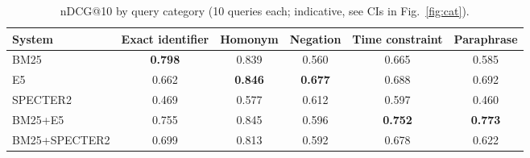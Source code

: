 \begin{table}[t]
\centering
\small
\caption{nDCG@10 by query category (10 queries each; indicative, see CIs in Fig.~\ref{fig:cat}).}
\label{tab:cat}
\begin{tabular}{lccccc}
\toprule
System & Exact identifier & Homonym & Negation & Time constraint & Paraphrase \\
\midrule
BM25 & \textbf{0.798} & 0.839 & 0.560 & 0.665 & 0.585 \\
E5 & 0.662 & \textbf{0.846} & \textbf{0.677} & 0.688 & 0.692 \\
SPECTER2 & 0.469 & 0.577 & 0.612 & 0.597 & 0.460 \\
BM25+E5 & 0.755 & 0.845 & 0.596 & \textbf{0.752} & \textbf{0.773} \\
BM25+SPECTER2 & 0.699 & 0.813 & 0.592 & 0.678 & 0.622 \\
\bottomrule
\end{tabular}
\end{table}
